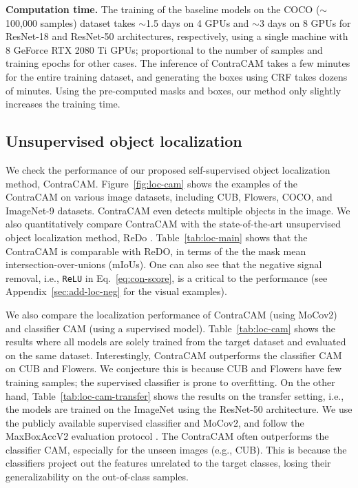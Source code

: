 \documentclass{article}
\begin{document}
\textbf{Computation time.}
The training of the baseline models on the COCO ($\sim$100,000 samples) dataset takes $\sim$1.5 days on 4 GPUs and $\sim$3 days on 8 GPUs for ResNet-18 and ResNet-50 architectures, respectively, using a single machine with 8 GeForce RTX 2080 Ti GPUs; proportional to the number of samples and training epochs for other cases. The inference of ContraCAM takes a few minutes for the entire training dataset, and generating the boxes using CRF takes dozens of minutes. Using the pre-computed masks and boxes, our method only slightly increases the training time.




\subsection{Unsupervised object localization}
\label{sec:exp-loc}

We check the performance of our proposed self-supervised object localization method, ContraCAM. Figure~\ref{fig:loc-cam} shows the examples of the ContraCAM on various image datasets, including CUB, Flowers, COCO, and ImageNet-9 datasets. ContraCAM even detects multiple objects in the image. We also quantitatively compare ContraCAM with the state-of-the-art unsupervised object localization method, ReDo \citep{chen2019unsupervised}. Table~\ref{tab:loc-main} shows that the ContraCAM is comparable with ReDO, in terms of the the mask mean intersection-over-unions (mIoUs). One can also see that the negative signal removal, i.e., \texttt{ReLU} in Eq.~\eqref{eq:con-score}, is a critical to the performance (see Appendix~\ref{sec:add-loc-neg} for the visual examples).

We also compare the localization performance of ContraCAM (using MoCov2) and classifier CAM (using a supervised model). Table~\ref{tab:loc-cam} shows the results where all models are solely trained from the target dataset and evaluated on the same dataset. Interestingly, ContraCAM outperforms the classifier CAM on CUB and Flowers. We conjecture this is because CUB and Flowers have few training samples; the supervised classifier is prone to overfitting. On the other hand, Table~\ref{tab:loc-cam-transfer} shows the results on the transfer setting, i.e., the models are trained on the ImageNet \citep{deng2009imagenet} using the ResNet-50 architecture. We use the publicly available supervised classifier \citep{paszke2019pytorch} and MoCov2, and follow the MaxBoxAccV2 evaluation protocol \citep{choe2020evaluating}. The ContraCAM often outperforms the classifier CAM, especially for the unseen images (e.g., CUB). This is because the classifiers project out the features unrelated to the target classes, losing their generalizability on the out-of-class samples.
\end{document}
